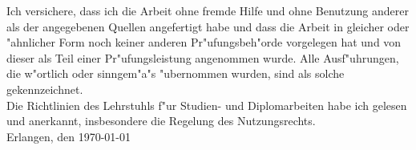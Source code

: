 \documentclass[english,mt]{lmedoc}
\begin{document}
\clearpage
  \begin{deckblatt}
  \end{deckblatt}


\cleardoublepage

Ich versichere, dass ich die Arbeit ohne fremde Hilfe und ohne Benutzung
anderer als der angegebenen Quellen angefertigt habe und dass die Arbeit
in gleicher oder "ahnlicher Form noch keiner anderen Pr"ufungsbeh"orde
vorgelegen hat und von dieser als Teil einer Pr"ufungsleistung
angenommen wurde. Alle Ausf"uhrungen, die w"ortlich oder sinngem"a"s
"ubernommen wurden, sind als solche gekennzeichnet.
\\

Die Richtlinien des Lehrstuhls f"ur Studien- und Diplomarbeiten
habe ich gelesen und anerkannt, insbesondere die Regelung des
Nutzungsrechts. \\[15mm]
Erlangen, den  \today \hspace{6.0cm} \\[10mm]


\cleardoublepage


\cleardoublepage

\tableofcontents

\cleardoublepage {}
\end{document}
